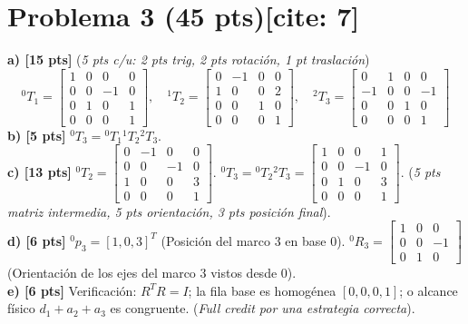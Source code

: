 \documentclass[11pt, a4paper]{article}
\begin{document}
\section*{Problema 3 (45 pts)[cite: 7]}
\textbf{a) [15 pts]} (\textit{5 pts c/u: 2 pts trig, 2 pts rotación, 1 pt traslación})
\begin{equation*}
    {}^{0}T_1 = \begin{bmatrix} 1 & 0 & 0 & 0 \\ 0 & 0 & -1 & 0 \\ 0 & 1 & 0 & 1 \\ 0 & 0 & 0 & 1 \end{bmatrix}, \quad
    {}^{1}T_2 = \begin{bmatrix} 0 & -1 & 0 & 0 \\ 1 & 0 & 0 & 2 \\ 0 & 0 & 1 & 0 \\ 0 & 0 & 0 & 1 \end{bmatrix}, \quad
    {}^{2}T_3 = \begin{bmatrix} 0 & 1 & 0 & 0 \\ -1 & 0 & 0 & -1 \\ 0 & 0 & 1 & 0 \\ 0 & 0 & 0 & 1 \end{bmatrix}
\end{equation*}
\textbf{b) [5 pts]} ${}^{0}T_3 = {}^{0}T_1 {}^{1}T_2 {}^{2}T_3$.\\
\textbf{c) [13 pts]} ${}^{0}T_2 = \begin{bmatrix} 0&-1&0&0 \\ 0&0&-1&0 \\ 1&0&0&3 \\ 0&0&0&1 \end{bmatrix}$. ${}^{0}T_3 = {}^{0}T_2 {}^{2}T_3 = \begin{bmatrix} 1&0&0&1 \\ 0&0&-1&0 \\ 0&1&0&3 \\ 0&0&0&1 \end{bmatrix}$. (\textit{5 pts matriz intermedia, 5 pts orientación, 3 pts posición final}). \\
\textbf{d) [6 pts]} ${}^{0}p_3 = [1, 0, 3]^T$ (Posición del marco 3 en base 0). ${}^{0}R_3 = \begin{bmatrix} 1&0&0 \\ 0&0&-1 \\ 0&1&0 \end{bmatrix}$ (Orientación de los ejes del marco 3 vistos desde 0). \\
\textbf{e) [6 pts]} Verificación: $R^TR = I$; la fila base es homogénea $[0,0,0,1]$; o alcance físico $d_1+a_2+a_3$ es congruente. (\textit{Full credit por una estrategia correcta}).
\end{document}
